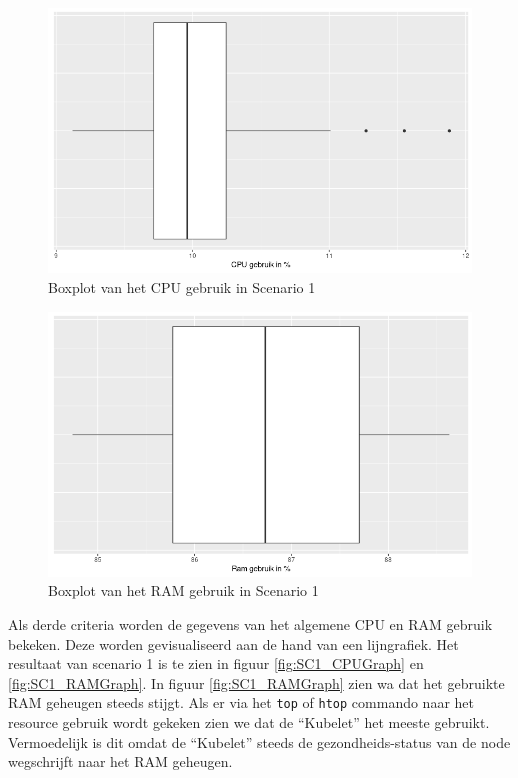 %
\begin{figure}[h]
	\centering
	\includegraphics[width=0.75\linewidth]{img/SC1_CPUBox.png}
	\caption{Boxplot van het CPU gebruik in Scenario 1}
	\label{fig:SC1_CPUBox}
\end{figure}

\begin{figure}[h]
	\centering
	\includegraphics[width=0.75\linewidth]{img/SC1_RAMBox.png}
	\caption{Boxplot van het RAM gebruik in Scenario 1}
	\label{fig:SC1_RAMBox}
\end{figure}

Als derde criteria worden de gegevens van het algemene CPU en RAM gebruik bekeken. Deze worden gevisualiseerd aan de hand van een lijngrafiek. Het resultaat van scenario 1 is te zien in figuur \ref{fig:SC1_CPUGraph} en \ref{fig:SC1_RAMGraph}. In figuur \ref{fig:SC1_RAMGraph} zien wa dat het gebruikte RAM geheugen steeds stijgt. Als er via het \verb|top| of \verb|htop| commando naar het resource gebruik wordt gekeken zien we dat de ``Kubelet'' het meeste gebruikt. Vermoedelijk is dit omdat de ``Kubelet'' steeds de gezondheids-status van de node wegschrijft naar het RAM geheugen.

